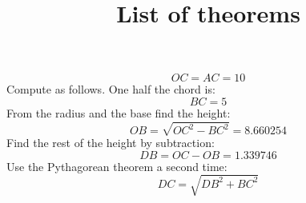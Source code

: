 \documentclass[11pt, oneside]{article}
\title{List of theorems}
\date{}
\begin{document}
\maketitle
\Large

\[ OC = AC = 10 \]
Compute as follows.  One half the chord is:
\[ BC = 5 \]
From the radius and the base find the height:
\[ OB = \sqrt{OC^2 - BC^2} = 8.660254 \]
Find the rest of the height by subtraction:
\[ DB = OC - OB = 1.339746 \]
Use the Pythagorean theorem a second time:
\[ DC = \sqrt{DB^2 + BC^2} \]
\end{document}
